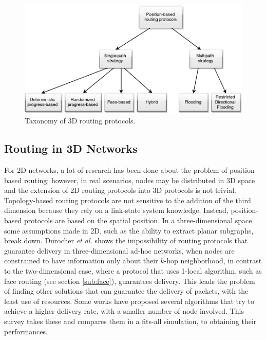 \documentclass[journal,comsoc]{IEEEtran}
\begin{document}
\begin{figure}[!t]
\centering
\includegraphics[width=5in]{taxonomy}
\caption{Taxonomy of 3D routing protocols.}
\label{fig:taxonomy}
\end{figure}

\subsection{Routing in 3D Networks}
For 2D networks, a lot of research has been done about the problem of position-based routing; however, in real scenarios, nodes may be distributed in 3D space and the extension of 2D routing protocols into 3D protocols is not trivial. Topology-based routing protocols are not sensitive to the addition of the third dimension because they rely on a link-state system knowledge. Instead, position-based protocols are based on the spatial position.
In a three-dimensional space some assumptions made in 2D, such as the ability to extract planar subgraphs, break down. Durocher \emph{et al.} \cite{duro:guaranteed} shows the impossibility of routing protocols that guarantee delivery in three-dimensional ad-hoc networks, when nodes are constrained to have information only about their \(k\)-hop neighborhood, in contrast to the two-dimensional case, where a protocol that uses 1-local algorithm, such as face routing (see section \ref{sub:face}), guarantees delivery. This leads the problem of finding other solutions that can guarantee the delivery of packets, with the least use of resources. 
Some works have proposed several algorithms that try to achieve a higher delivery rate, with a smaller number of node involved. This survey takes these and compares them in a fits-all simulation, to obtaining their performances.
\end{document}
